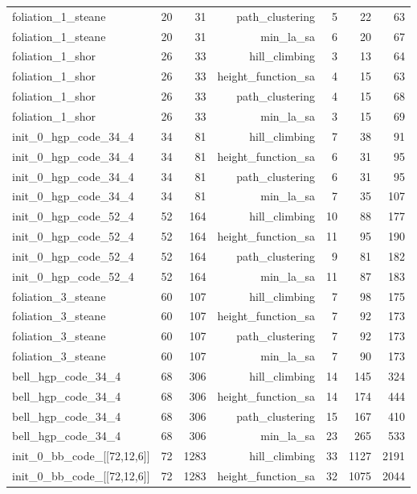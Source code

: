 \begin{longtable}{lrrrrrr}
  foliation\_1\_steane & 20 & 31 & path\_clustering & 5 & 22 & 63 \\
  foliation\_1\_steane & 20 & 31 & min\_la\_sa & 6 & 20 & 67 \\
  foliation\_1\_shor & 26 & 33 & hill\_climbing & 3 & 13 & 64 \\
  foliation\_1\_shor & 26 & 33 & height\_function\_sa & 4 & 15 & 63 \\
  foliation\_1\_shor & 26 & 33 & path\_clustering & 4 & 15 & 68 \\
  foliation\_1\_shor & 26 & 33 & min\_la\_sa & 3 & 15 & 69 \\
  init\_0\_hgp\_code\_34\_4 & 34 & 81 & hill\_climbing & 7 & 38 & 91 \\
  init\_0\_hgp\_code\_34\_4 & 34 & 81 & height\_function\_sa & 6 & 31 & 95 \\
  init\_0\_hgp\_code\_34\_4 & 34 & 81 & path\_clustering & 6 & 31 & 95 \\
  init\_0\_hgp\_code\_34\_4 & 34 & 81 & min\_la\_sa & 7 & 35 & 107 \\
  init\_0\_hgp\_code\_52\_4 & 52 & 164 & hill\_climbing & 10 & 88 & 177 \\
  init\_0\_hgp\_code\_52\_4 & 52 & 164 & height\_function\_sa & 11 & 95 & 190 \\
  init\_0\_hgp\_code\_52\_4 & 52 & 164 & path\_clustering & 9 & 81 & 182 \\
  init\_0\_hgp\_code\_52\_4 & 52 & 164 & min\_la\_sa & 11 & 87 & 183 \\
  foliation\_3\_steane & 60 & 107 & hill\_climbing & 7 & 98 & 175 \\
  foliation\_3\_steane & 60 & 107 & height\_function\_sa & 7 & 92 & 173 \\
  foliation\_3\_steane & 60 & 107 & path\_clustering & 7 & 92 & 173 \\
  foliation\_3\_steane & 60 & 107 & min\_la\_sa & 7 & 90 & 173 \\
  bell\_hgp\_code\_34\_4 & 68 & 306 & hill\_climbing & 14 & 145 & 324 \\
  bell\_hgp\_code\_34\_4 & 68 & 306 & height\_function\_sa & 14 & 174 & 444 \\
  bell\_hgp\_code\_34\_4 & 68 & 306 & path\_clustering & 15 & 167 & 410 \\
  bell\_hgp\_code\_34\_4 & 68 & 306 & min\_la\_sa & 23 & 265 & 533 \\
  init\_0\_bb\_code\_[[72,12,6]] & 72 & 1283 & hill\_climbing & 33 & 1127 & 2191 \\
  init\_0\_bb\_code\_[[72,12,6]] & 72 & 1283 & height\_function\_sa & 32 & 1075 & 2044 \\

\end{longtable}
